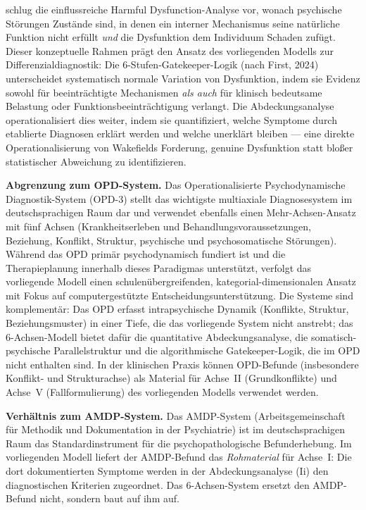 \documentclass[11pt,a4paper]{article}
\begin{document}
\citet{Wakefield1992} schlug die einflussreiche \glqq Harmful Dysfunction\grqq{}-Analyse vor, wonach psychische St\"orungen Zust\"ande sind, in denen ein interner Mechanismus seine nat\"urliche Funktion nicht erf\"ullt \textit{und} die Dysfunktion dem Individuum Schaden zuf\"ugt. Dieser konzeptuelle Rahmen pr\"agt den Ansatz des vorliegenden Modells zur Differenzialdiagnostik: Die 6-Stufen-Gatekeeper-Logik (nach First, 2024) unterscheidet systematisch normale Variation von Dysfunktion, indem sie Evidenz sowohl f\"ur beeintr\"achtigte Mechanismen \textit{als auch} f\"ur klinisch bedeutsame Belastung oder Funktionsbeeintr\"achtigung verlangt. Die Abdeckungsanalyse operationalisiert dies weiter, indem sie quantifiziert, welche Symptome durch etablierte Diagnosen erkl\"art werden und welche unerkl\"art bleiben --- eine direkte Operationalisierung von Wakefields Forderung, genuine Dysfunktion statt blo\ss{}er statistischer Abweichung zu identifizieren.

\textbf{Abgrenzung zum OPD-System.} Das Operationalisierte Psychodynamische Diagnostik-System (OPD-3) stellt das wichtigste multiaxiale Diagnosesystem im deutschsprachigen Raum dar und verwendet ebenfalls einen Mehr-Achsen-Ansatz mit f\"unf Achsen (Krankheitserleben und Behandlungsvoraussetzungen, Beziehung, Konflikt, Struktur, psychische und psychosomatische St\"orungen). W\"ahrend das OPD prim\"ar psychodynamisch fundiert ist und die Therapieplanung innerhalb dieses Paradigmas unterst\"utzt, verfolgt das vorliegende Modell einen schulen\"ubergreifenden, kategorial-dimensionalen Ansatz mit Fokus auf computergest\"utzte Entscheidungsunterst\"utzung. Die Systeme sind komplement\"ar: Das OPD erfasst intrapsychische Dynamik (Konflikte, Struktur, Beziehungsmuster) in einer Tiefe, die das vorliegende System nicht anstrebt; das 6-Achsen-Modell bietet daf\"ur die quantitative Abdeckungsanalyse, die somatisch-psychische Parallelstruktur und die algorithmische Gatekeeper-Logik, die im OPD nicht enthalten sind. In der klinischen Praxis k\"onnen OPD-Befunde (insbesondere Konflikt- und Strukturachse) als Material f\"ur Achse~II (Grundkonflikte) und Achse~V (Fallformulierung) des vorliegenden Modells verwendet werden.

\textbf{Verh\"altnis zum AMDP-System.} Das AMDP-System (Arbeitsgemeinschaft f\"ur Methodik und Dokumentation in der Psychiatrie) ist im deutschsprachigen Raum das Standardinstrument f\"ur die psychopathologische Befunderhebung. Im vorliegenden Modell liefert der AMDP-Befund das \textit{Rohmaterial} f\"ur Achse~I: Die dort dokumentierten Symptome werden in der Abdeckungsanalyse (Ii) den diagnostischen Kriterien zugeordnet. Das 6-Achsen-System ersetzt den AMDP-Befund nicht, sondern baut auf ihm auf.
\end{document}
